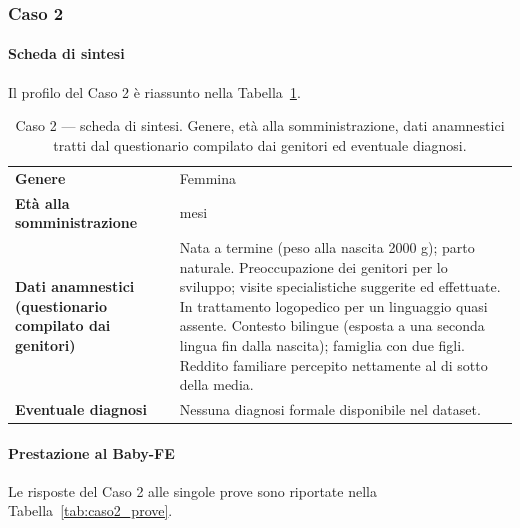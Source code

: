  \subsubsection*{Caso 2}

 \paragraph*{Scheda di sintesi}

Il profilo del Caso 2 è riassunto nella Tabella~\ref{tab:caso2_scheda}.

\begin{table}[htbp]
\centering
\caption[Caso 2 --- scheda di sintesi]{Caso 2 --- scheda di sintesi. Genere, età alla somministrazione, dati anamnestici tratti dal questionario compilato dai genitori ed eventuale diagnosi.}
\label{tab:caso2_scheda}
\begin{tabular}{|>{\raggedright\arraybackslash}p{4.3cm}|>{\raggedright\arraybackslash}p{9.2cm}|}
\toprule
\textbf{Genere} & Femmina \\
\textbf{Età alla somministrazione} & 31 mesi \\
\textbf{Dati anamnestici (questionario compilato dai genitori)} & Nata a termine (peso alla nascita 2000 g); parto naturale. Preoccupazione dei genitori per lo sviluppo; visite specialistiche suggerite ed effettuate. In trattamento logopedico per un linguaggio quasi assente. Contesto bilingue (esposta a una seconda lingua fin dalla nascita); famiglia con due figli. Reddito familiare percepito nettamente al di sotto della media. \\
\textbf{Eventuale diagnosi} & Nessuna diagnosi formale disponibile nel dataset. \\
\bottomrule
\end{tabular}
\end{table}

 \paragraph*{Prestazione al Baby-FE}

Le risposte del Caso 2 alle singole prove sono riportate nella Tabella~\ref{tab:caso2_prove}.

